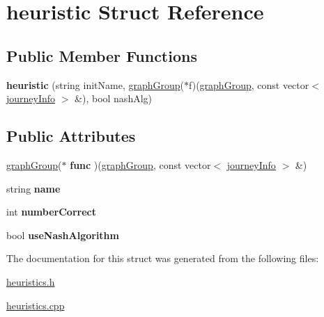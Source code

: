 \hypertarget{structheuristic}{
\section{heuristic Struct Reference}
\label{structheuristic}
}
\subsection*{Public Member Functions}
\begin{DoxyCompactItemize}
\item 
\hypertarget{structheuristic_a55fefe60d14f39c03f40eefed0cf2dd5}{
{\bfseries heuristic} (string initName, \hyperlink{classgraphGroup}{graphGroup}($\ast$f)(\hyperlink{classgraphGroup}{graphGroup}, const vector$<$ \hyperlink{classjourneyInfo}{journeyInfo} $>$ \&), bool nashAlg)}
\label{structheuristic_a55fefe60d14f39c03f40eefed0cf2dd5}

\end{DoxyCompactItemize}
\subsection*{Public Attributes}
\begin{DoxyCompactItemize}
\item 
\hypertarget{structheuristic_aceebe2cb9b605774e85054a66945b614}{
\hyperlink{classgraphGroup}{graphGroup}($\ast$ {\bfseries func} )(\hyperlink{classgraphGroup}{graphGroup}, const vector$<$ \hyperlink{classjourneyInfo}{journeyInfo} $>$ \&)}
\label{structheuristic_aceebe2cb9b605774e85054a66945b614}

\item 
\hypertarget{structheuristic_a8316378e2a3ae81949f7ac7dd010821c}{
string {\bfseries name}}
\label{structheuristic_a8316378e2a3ae81949f7ac7dd010821c}

\item 
\hypertarget{structheuristic_a012235b1e6e394d631199bae1ac16fd2}{
int {\bfseries numberCorrect}}
\label{structheuristic_a012235b1e6e394d631199bae1ac16fd2}

\item 
\hypertarget{structheuristic_a3e22c00753fade6df85525df1bfbf02c}{
bool {\bfseries useNashAlgorithm}}
\label{structheuristic_a3e22c00753fade6df85525df1bfbf02c}

\end{DoxyCompactItemize}


The documentation for this struct was generated from the following files:\begin{DoxyCompactItemize}
\item 
\hyperlink{heuristics_8h}{heuristics.h}\item 
\hyperlink{heuristics_8cpp}{heuristics.cpp}\end{DoxyCompactItemize}
